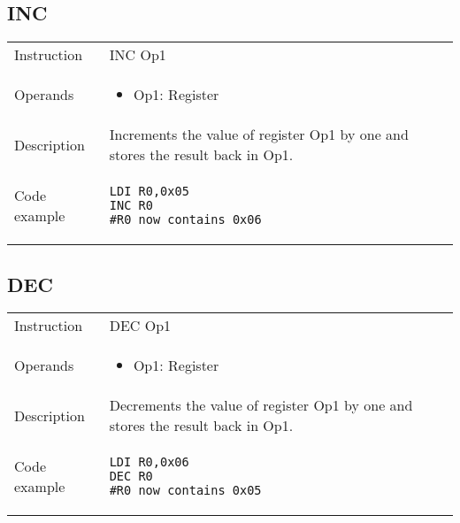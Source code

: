 \subsection{INC}
\renewcommand*{\arraystretch}{2.0}
\begin{longtable}{P{3cm}P{9cm}}
\midrule
\noindent Instruction & INC Op1 \\
\noindent Operands &
\begin{itemize}[label={},noitemsep,leftmargin=*,topsep=0pt,partopsep=0pt, itemsep=1em]
\item Op1: Register
\end{itemize}\\
\noindent Description & Increments the value of register Op1 by one and stores the result back in Op1.
	 \\
\noindent Code example & 
\begin{lstlisting}
LDI R0,0x05
INC R0
#R0 now contains 0x06
\end{lstlisting} \\
\end{longtable}


\subsection{DEC}
\renewcommand*{\arraystretch}{2.0}
\begin{longtable}{P{3cm}P{9cm}}
\midrule
\noindent Instruction & DEC Op1 \\
\noindent Operands &
\begin{itemize}[label={},noitemsep,leftmargin=*,topsep=0pt,partopsep=0pt, itemsep=1em]
\item Op1: Register
\end{itemize}\\
\noindent Description & Decrements the value of register Op1 by one and stores the result back in Op1.
	 \\
\noindent Code example & 
\begin{lstlisting}
LDI R0,0x06
DEC R0
#R0 now contains 0x05
\end{lstlisting} \\
\end{longtable}

\newpage

